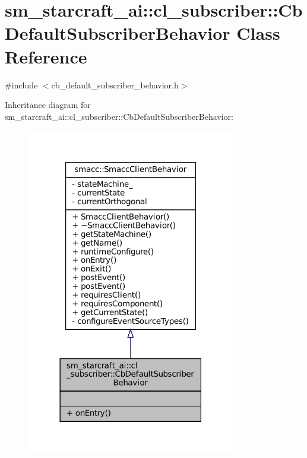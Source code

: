 \hypertarget{classsm__starcraft__ai_1_1cl__subscriber_1_1CbDefaultSubscriberBehavior}{}\section{sm\+\_\+starcraft\+\_\+ai\+:\+:cl\+\_\+subscriber\+:\+:Cb\+Default\+Subscriber\+Behavior Class Reference}
\label{classsm__starcraft__ai_1_1cl__subscriber_1_1CbDefaultSubscriberBehavior}


{\ttfamily \#include $<$cb\+\_\+default\+\_\+subscriber\+\_\+behavior.\+h$>$}



Inheritance diagram for sm\+\_\+starcraft\+\_\+ai\+:\+:cl\+\_\+subscriber\+:\+:Cb\+Default\+Subscriber\+Behavior\+:
\nopagebreak
\begin{figure}[H]
\begin{center}
\leavevmode
\includegraphics[width=258pt]{classsm__starcraft__ai_1_1cl__subscriber_1_1CbDefaultSubscriberBehavior__inherit__graph}
\end{center}
\end{figure}


